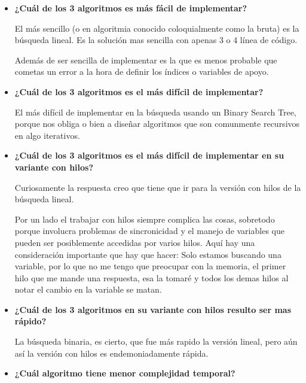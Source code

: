 \documentclass[12pt, fleqn]{article}                             %
\theoremstyle{break}                                            %
\begin{document}
        \begin{itemize}
            \item 
                \textbf{¿Cuál de los 3 algoritmos es más fácil de implementar?}

                El más sencillo (o en algoritmia conocido coloquialmente como la bruta)
                es la búsqueda lineal. Es la solución mas sencilla con apenas 3 o 4 línea de código.

                Además de ser sencilla de implementar es la que es menos probable que cometas un error
                a la hora de definir los índices o variables de apoyo.

            \item 
                \textbf{¿Cuál de los 3 algoritmos es el más difícil de implementar?}

                El más difícil de implementar en la búsqueda usando un Binary Search Tree, porque
                nos obliga o bien a diseñar algoritmos que son comunmente recursivos en algo
                iterativos.

            \item
                \textbf{¿Cuál de los 3 algoritmos es el más difícil de implementar en su variante
                con hilos?}

                Curiosamente la respuesta creo que tiene que ir para la versión con hilos de la búsqueda
                lineal.

                Por un lado el trabajar con hilos siempre complica las cosas, sobretodo porque involucra
                problemas de sincronicidad y el manejo de variables que pueden ser posiblemente accedidas
                por varios hilos. Aquí hay una consideración importante que hay que hacer:
                Solo estamos buscando una variable, por lo que no me tengo que preocupar con la memoria, 
                el primer hilo que me mande una respuesta, esa la tomaré y todos los demas hilos al notar
                el cambio en la variable se matan.

            \item
                \textbf{¿Cuál de los 3 algoritmos en su variante con hilos resulto ser mas rápido?}

                La búsqueda binaria, es cierto, que fue más rapido la versión lineal, pero aún así
                la versión con hilos es endemoniadamente rápida.

            \item
                \textbf{¿Cuál algoritmo tiene menor complejidad temporal?}


\end{itemize}
\end{document}
